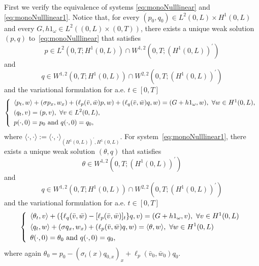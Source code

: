 \documentclass[10pt]{article}
\def\dis{\displaystyle}
\def\om{\omega}
\def\\Phivec{\mathbf{\Phi}}
\begin{document}
	First we verify the equivalence of systems \eqref{eq:monoNulllinear} and \eqref{eq:monoNulllinear1}.
Notice that, for every $(p_0,q_0)\in L^2(0,L)\times H^1(0,L)$ and every
	$G,h1_{\omega}\in L^2((0,L)\times(0,T))$,
	there exists a unique weak solution $(p,q)$ to~\eqref{eq:monoNulllinear} that satisfies
\[
	p\in L^2(0,T;H^1(0,L))\cap W^{1,2}(0,T;(H^1(0,L))^\prime)
\]
	and
\[
	q\in  W^{1,2}(0,T;H^1(0,L))\cap W^{2,2}(0,T;(H^1(0,L))^\prime)
\]
	and the variational formulation for a.e. $t\in[0,T]$
\begin{equation}\label{var:pq}
	\left\{
		\begin{array}{l}
	
	\langle p_t,w\rangle+(\sigma p_x, w_x) +(\ell_p(\bar v,\bar w)p,w)
	+ (\ell_q(\bar v,\bar w) q,w)=(G+h1_\om,w),~\forall w\in H^1(0,L),\\
	\noalign{\smallskip}\dis
	(q_t,v)=(p,v),~\forall v\in L^2(0,L),\\
	\noalign{\smallskip}\dis
	p(\cdot,0)=p_0 ~\hbox{and}~q(\cdot,0)=q_0,
\end{array}
	\right.
\end{equation}
	where $\langle \cdot,\cdot\rangle:=\langle \cdot,\cdot\rangle_{(H^1(0,L))^\prime,H^1(0,L)}$.\newline
	For system~\eqref{eq:monoNulllinear1}, there exists a unique weak solution $(\theta,q)$ that satisfies
\[
	\theta \in  W^{1,2}(0,T;(H^1(0,L))^\prime)
\]
	and
\[
	q \in  W^{1,2}(0,T;H^1(0,L))\cap W^{2,2}(0,T;(H^1(0,L))^\prime)
\]
   	and the variational formulation for a.e. $t\in[0,T]$
\begin{equation}\label{var:thetaq}
	\left\{
		\begin{array}{l}
		\langle\theta_t,v\rangle+(\{\ell_q(\bar v,\bar w)-[\ell_p(\bar v,\bar w)]_t\} q,v)=(G+h1_{\omega} ,v),~\forall v\in H^1(0,L)\\
	\noalign{\smallskip}\dis
	\langle q_t,w\rangle+(\sigma q_x, w_x) +(\ell_p(\bar v,\bar w)q,w)=
	\langle \theta,w\rangle,~\forall w\in H^1(0,L)\\
	\noalign{\smallskip}\dis
	\theta(\cdot,0)=\theta_0 ~\hbox{and}~q(\cdot,0)=q_0,
		\end{array}
	\right.
\end{equation}
	where again $\theta_0=p_0-(\sigma_i (x)q_{0,x})_x +\ell_p(\bar v_0,\bar w_0)q_0$.
\end{document}

